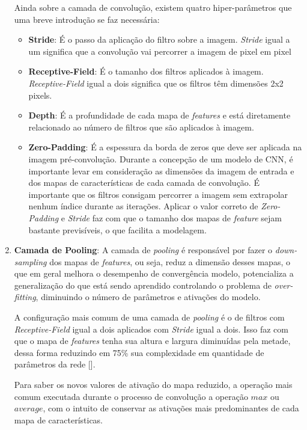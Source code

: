 \begin{enumerate}
            Ainda sobre a camada de convolução, existem quatro hiper-parâmetros que uma breve introdução se faz necessária:
            \begin{itemize}
                \item \textbf{Stride}: É o passo da aplicação do filtro sobre a imagem. \textit{Stride} igual a um significa que a convolução vai percorrer a imagem de pixel em pixel
                \item \textbf{Receptive-Field}: É o tamanho dos filtros aplicados à imagem. \textit{Receptive-Field} igual a dois significa que os filtros têm dimensões 2x2 pixels.
                \item \textbf{Depth}: É a profundidade de cada mapa de \textit{features} e está diretamente relacionado ao número de filtros que são aplicados à imagem.
                \item \textbf{Zero-Padding}: É a espessura da borda de zeros que deve ser aplicada na imagem pré-convolução. Durante a concepção de um modelo de CNN, é importante levar em consideração as dimensões da imagem de entrada e dos mapas de características de cada camada de convolução. É importante que os filtros consigam percorrer a imagem sem extrapolar nenhum índice durante as iterações. Aplicar o valor correto de \textit{Zero-Padding} e \textit{Stride} faz com que o tamanho dos mapas de \textit{feature} sejam bastante previsíveis, o que facilita a modelagem.
            \end{itemize}
            
    \item \textbf{Camada de Pooling}:
            A camada de \textit{pooling} é responsável por fazer o \textit{down-sampling} dos mapas de \textit{features}, ou seja, reduz a dimensão desses mapas, o que em geral melhora o desempenho de convergência modelo, potencializa a generalização do que está sendo aprendido controlando o problema de \textit{over-fitting}, diminuindo o número de parâmetros e ativações do modelo.
            
            A configuração mais comum de uma camada de \textit{pooling} é o de filtros com \textit{Receptive-Field} igual a dois aplicados com \textit{Stride} igual a dois. Isso faz com que o mapa de \textit{features} tenha sua altura e largura diminuídas pela metade, dessa forma reduzindo em 75\% sua complexidade em quantidade de parâmetros da rede [].
            
            Para saber os novos valores de ativação do mapa reduzido, a operação mais comum executada durante o processo de convolução a operação $max$ ou $average$, com o intuito de conservar as ativações mais predominantes de cada mapa de características.
            

\end{enumerate}
